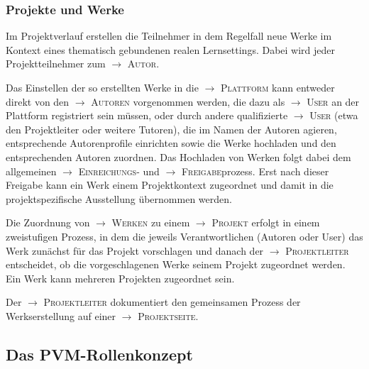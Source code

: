 \documentclass[a4paper,11pt]{article}
\newcommand{\glossar}[1]{{$\to$ \textsc{#1}}}
\begin{document}
\subsubsection{Projekte und Werke}

Im Projektverlauf erstellen die Teilnehmer in dem Regelfall neue Werke im
Kontext eines thematisch gebundenen realen Lernsettings. Dabei wird jeder
Projektteilnehmer zum \glossar{Autor}.

Das Einstellen der so erstellten Werke in die \glossar{Plattform} kann entweder
direkt von den \glossar{Autoren} vorgenommen werden, die dazu als
\glossar{User} an der Plattform registriert sein müssen, oder durch andere
qualifizierte \glossar{User} (etwa den Projektleiter oder weitere Tutoren), die
im Namen der Autoren agieren, entsprechende Autorenprofile einrichten sowie die
Werke hochladen und den entsprechenden Autoren zuordnen.  Das Hochladen von
Werken folgt dabei dem allgemeinen \glossar{Einreichungs}- und
\glossar{Freigabe}prozess.  Erst nach dieser Freigabe kann ein Werk einem
Projektkontext zugeordnet und damit in die projektspezifische Ausstellung
übernommen werden.

Die Zuordnung von \glossar{Werken} zu einem \glossar{Projekt} erfolgt in einem
zweistufigen Prozess, in dem die jeweils Verantwortlichen (Autoren oder User)
das Werk zunächst für das Projekt vorschlagen und danach der
\glossar{Projektleiter} entscheidet, ob die vorgeschlagenen Werke seinem
Projekt zugeordnet werden. Ein Werk kann mehreren Projekten zugeordnet sein. 

Der \glossar{Projektleiter} dokumentiert den gemeinsamen Prozess der
Werkserstellung auf einer \glossar{Projektseite}.

\subsection{Das PVM-Rollenkonzept}\label{grundlagen.rollenkonzept}
\end{document}
